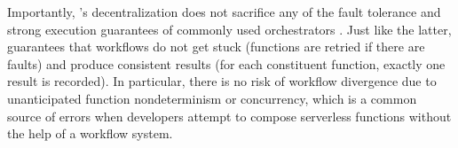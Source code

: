 Importantly, \name{}'s decentralization does not sacrifice any of the  
fault tolerance and strong execution guarantees of 
commonly used orchestrators \cite{aws-step-functions, durable-functions,
 google-cloud-composer, google-workflows}. 
Just like the latter, 
\name{} guarantees that workflows do not get stuck (functions are retried if there are faults)
and produce consistent results (for each constituent function, exactly one result is recorded).
In particular, there is no risk of workflow divergence due to unanticipated function
nondeterminism or concurrency, which is a common source of errors
when developers attempt to compose serverless functions without the help
of a workflow system.






